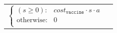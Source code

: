 \begin{itemize}
{\begin{tabular}{ll}
            \qquad $ \begin{cases}
            (s \geq 0) : & cost_{\mathtt{vaccine}} \cdot s \cdot a \\
            \text{otherwise} : & 0 \\
            \end{cases} $ & $ $ \\
        \end{tabular}
    }    
\end{itemize} 


